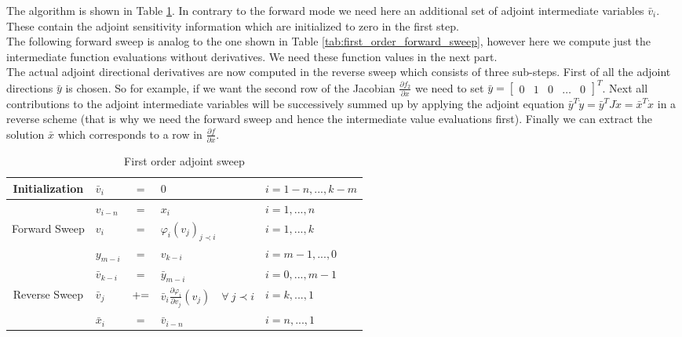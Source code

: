 \documentclass{scrartcl}[12pt, halfparskip]
\begin{document}
The algorithm is shown in Table \ref{tab:first_order_adjoint_sweep}. In contrary to the forward mode we need here an additional set of adjoint intermediate variables $\bar{v}_i$. These contain the adjoint sensitivity information which are initialized to zero in the first step. \\
The following forward sweep is analog to the one shown in Table \ref{tab:first_order_forward_sweep}, however here we compute just the intermediate function evaluations without derivatives. We need these function values in the next part. \\
The actual adjoint directional derivatives are now computed in the reverse sweep which consists of three sub-steps. First of all the adjoint directions $\bar{y}$ is chosen. So for example, if we want the second row of the Jacobian $\frac{\partial f_2}{\partial x}$ we need to set $\bar{y} = \begin{bmatrix}
0 & 1 & 0 & \dots & 0
\end{bmatrix}^T$.
Next all contributions to the adjoint intermediate variables will be successively summed up by applying the adjoint equation $\bar{y}^T \dot{y} = \bar{y}^T J \dot{x} = \bar{x}^T \dot{x}$ in a reverse scheme (that is why we need the forward sweep and hence the intermediate value evaluations first). Finally we can extract the solution $\bar{x}$ which corresponds to a row in $\frac{\partial f}{\partial x}$.


\begin{table}[H]
\centering
\begin{tabular}{| c | l c l | l |} \hline
	Initialization & $\bar{v}_i$ & $=$ & $0$ & $i=1-n,...,k-m$ \\ \hline
	& $v_{i-n}$ & $=$ & $x_i$ & $i=1,...,n$ \\
	Forward Sweep & $v_{i}$ & $=$ & $\varphi_i(v_j)_{j \prec i}$ & $i=1,...,k$ \\
	& $y_{m-i}$ & $=$ & $v_{k-i}$ & $i=m-1,...,0$ \\ \hline
	& $\bar{v}_{k-i}$ & $=$ & $\bar{y}_{m-i}$ & $i=0,...,m-1$ \\
	Reverse Sweep & $\bar{v}_j$ & $+ \hspace{-0.1cm} =$ & $\bar{v}_i \frac{\partial \varphi_i}{\partial v_j}(v_j) \quad \forall \ j \prec i$ & $i=k,...,1$ \\
	& $\bar{x}_i$ & $=$ & $\bar{v}_{i-n}$ & $i=n,...,1$ \\ \hline
\end{tabular}
\caption{First order adjoint sweep}
\label{tab:first_order_adjoint_sweep}
\end{table}
\end{document}
